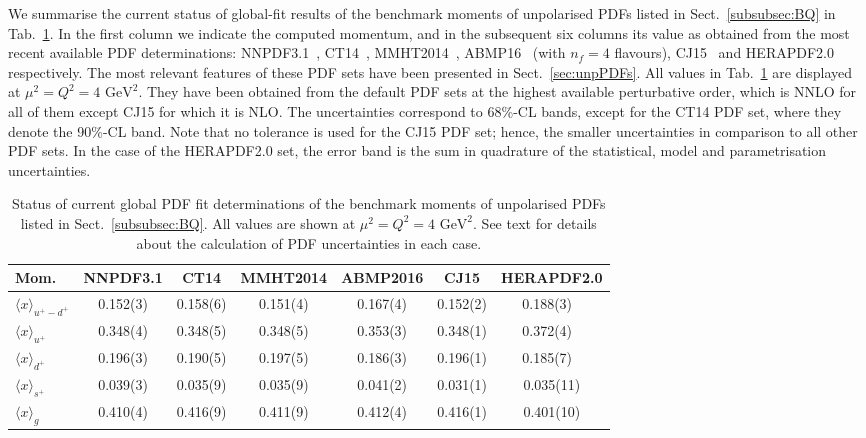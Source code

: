 We summarise the current status of global-fit results of the benchmark
moments of unpolarised PDFs listed in Sect.~\ref{subsubsec:BQ} 
in Tab.~\ref{tab:unpPDFmoms}.
%
In the first column we indicate the computed momentum, and in the subsequent 
six columns its value as obtained from the most recent available PDF 
determinations: NNPDF3.1~\cite{Ball:2017nwa},
CT14~\cite{Dulat:2015mca}, MMHT2014~\cite{Harland-Lang:2014zoa},
ABMP16~\cite{Alekhin:2017kpj} (with $n_f=4$ flavours), 
CJ15~\cite{Accardi:2016qay} and 
HERAPDF2.0~\cite{Abramowicz:2015mha} respectively.
%
The most relevant features of these PDF sets have been presented in 
Sect.~\ref{sec:unpPDFs}.
%
All values in Tab.~\ref{tab:unpPDFmoms} are displayed
at $\mu^2=Q^2=4\mbox{ GeV}^2$. 
%
They have been obtained from the default PDF sets at the highest available 
perturbative order, which is NNLO for all of them except CJ15
for which it is NLO.
%
The uncertainties correspond to 68\%-CL bands, except for the CT14 PDF set,
where they denote the 90\%-CL band.
%
Note that no tolerance is used for the CJ15 PDF set; hence, the 
smaller uncertainties in comparison to all other PDF sets.
%
In the case of the HERAPDF2.0 set, the error band is the sum in quadrature 
of the statistical, model and parametrisation uncertainties.

\begin{table}[!t]
\centering
\renewcommand{\arraystretch}{1.2}
\begin{tabular}{lcccccc}
\toprule
Mom. 
& NNPDF3.1 & CT14 & MMHT2014 & ABMP2016 & CJ15 & HERAPDF2.0 \\
\midrule
$\langle x \rangle_{u^+-d^+}$ 
& 0.152(3) & 0.158(6) & 0.151(4) & 0.167(4) & 0.152(2) & 0.188(3)\ \,\\
$\langle x \rangle_{u^+}$    
& 0.348(4) & 0.348(5) & 0.348(5) & 0.353(3) & 0.348(1) & 0.372(4)\ \,\\
$\langle x \rangle_{d^+}$    
& 0.196(3) & 0.190(5) & 0.197(5) & 0.186(3) & 0.196(1) & 0.185(7)\ \,\\
$\langle x \rangle_{s^+}$    
& 0.039(3) & 0.035(9) & 0.035(9) & 0.041(2) & 0.031(1) & 0.035(11)\\
$\langle x \rangle_{g}$     
& 0.410(4) & 0.416(9) & 0.411(9) & 0.412(4) & 0.416(1) & 0.401(10)\\
\bottomrule
\end{tabular}
\caption{\small Status of current global PDF fit determinations of the 
benchmark moments of unpolarised PDFs listed in Sect.~\ref{subsubsec:BQ}.
All values are shown at $\mu^2=Q^2=4\mbox{ GeV}^2$.
%
See text for details about the calculation of PDF uncertainties in each case.
}
\label{tab:unpPDFmoms}
\end{table}

